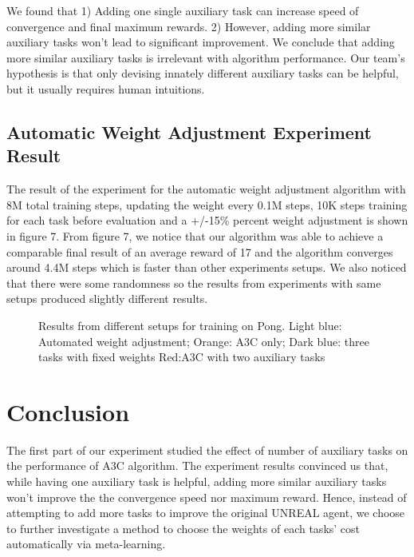 \documentclass[12pt,twocolumn,letterpaper]{article}
\begin{document}
We found that 1) Adding one single auxiliary task can increase speed of convergence and final maximum rewards. 2) However, adding more similar auxiliary tasks won’t lead to significant improvement. We conclude that adding more similar auxiliary tasks is irrelevant with algorithm performance. Our team's hypothesis is that only devising innately different auxiliary tasks can be helpful, but it usually requires human intuitions.

\subsection{Automatic Weight Adjustment Experiment Result}
The result of the experiment for the automatic weight adjustment algorithm with 8M total training steps, updating the weight every 0.1M steps, 10K steps training for each task before evaluation and a +/-15\% percent weight adjustment is shown in figure 7. From figure 7, we notice that our algorithm was able to achieve a comparable final result of an average reward of 17 and the algorithm converges around 4.4M steps which is faster than other experiments setups. We also noticed that there were some randomness so the results from experiments with same setups produced slightly different results.

\begin{figure}[H]
\begin{center}
\end{center}
   \caption{Results from different setups for training on Pong. 
Light blue: Automated weight adjustment;
Orange: A3C only; Dark blue: three tasks with fixed weights
Red:A3C with two auxiliary tasks}
\label{fig:long}
\label{fig:onecol}
\end{figure}

\section{Conclusion}
The first part of our experiment studied the effect of number of auxiliary tasks on the performance of A3C algorithm. The experiment results convinced us that, while having one auxiliary task is helpful, adding more similar auxiliary tasks won't improve the the convergence speed nor maximum reward. Hence, instead of attempting to add more tasks to improve the original UNREAL agent, we choose to further investigate a method to choose the weights of each tasks' cost automatically via meta-learning. 
 
\end{document}
